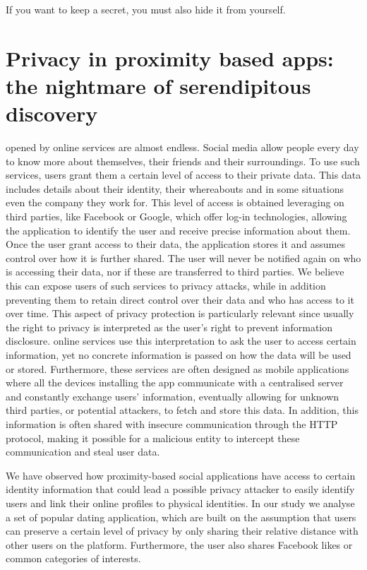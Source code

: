 \begin{savequote}[75mm]
If you want to keep a secret, you must also hide it from yourself.
\end{savequote}

\chapter{Privacy in proximity based apps: the nightmare of serendipitous discovery}

 opened by online services are almost endless. Social media allow people every day to know more about themselves, their friends and their surroundings. To use such services, users grant them a certain level of access to their private data. This data includes details about their identity, their whereabouts and in some situations even the company they work for. This level of access is obtained leveraging on third parties, like Facebook or Google, which offer log-in technologies, allowing the application to identify the user and receive precise information about them.
Once the user grant access to their data, the application stores it and assumes control over how it is further shared. The user will never be notified again on who is accessing their data, nor if these are transferred to third parties.
We believe this can expose users of such services to privacy attacks, while in addition preventing them to retain direct control over their data and who has access to it over time.
This aspect of privacy protection is particularly relevant since usually the right to privacy is interpreted as the user's right to prevent information disclosure. online services use this interpretation to ask the user to access certain information, yet no concrete information is passed on how the data will be used or stored. Furthermore, these services are often designed as mobile applications where all the devices installing the app communicate with a centralised server and constantly exchange users' information, eventually allowing for unknown third parties, or potential attackers, to fetch and store this data. In addition, this information is often shared with insecure communication through the HTTP protocol, making it possible for a malicious entity to intercept these communication and steal user data.

We have observed how proximity-based social applications have access to certain identity information that could lead a possible privacy attacker to easily identify users and link their online profiles to physical identities. In our study we analyse a set of popular dating application, which are built on the assumption that users can preserve a certain level of privacy by only sharing their relative distance with other users on the platform. Furthermore, the user also shares Facebook likes or common categories of interests.

